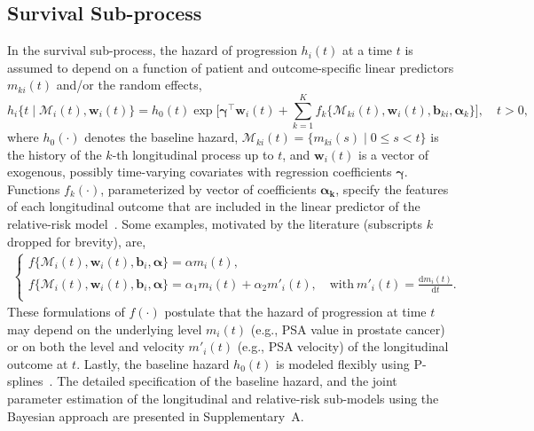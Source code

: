 \subsection{Survival Sub-process}
\label{subsec:surival_sub_model}
In the survival sub-process, the hazard of progression $h_i(t)$ at a time $t$ is assumed to depend on a function of patient and outcome-specific linear predictors $m_{ki}(t)$ and/or the random effects,
\begin{equation*}
\label{eq:rel_risk_model}
h_i\big\{t \mid \mathcal{M}_i(t), \boldsymbol{w}_i(t)\big\} = h_0(t) \exp\Big[\boldsymbol{\gamma}^{\top}\boldsymbol{w}_i(t) + \sum_{k=1}^{K} f_{k} \big\{ \mathcal{M}_{ki}(t), \boldsymbol{w}_i(t), \boldsymbol{b}_{ki}, \boldsymbol{\alpha}_{k} \big\}\Big], \quad t>0,
\end{equation*}
where $h_0(\cdot)$ denotes the baseline hazard, $\mathcal{M}_{ki}(t)=\{m_{ki}(s) \mid 0 \leq s < t \}$ is the history of the ${k\mbox{-th}}$ longitudinal process up to $t$, and $\boldsymbol{w}_i(t)$ is a vector of exogenous, possibly time-varying covariates with regression coefficients $\boldsymbol{\gamma}$. Functions $f_{k}(\cdot)$, parameterized by vector of coefficients $\boldsymbol{\alpha_{k}}$, specify the features of each longitudinal outcome that are included in the linear predictor of the relative-risk model~\citep{brown2009assessing,rizopoulos2012joint,taylor2013real}. Some examples, motivated by the literature (subscripts $k$ dropped for brevity), are,
\begin{eqnarray*}
\left \{
\begin{array}{l}
f\big\{\mathcal{M}_{i}(t), \boldsymbol{w}_i(t), \boldsymbol{b}_{i}, \boldsymbol{\alpha} \big\} = \alpha m_{i}(t),\\
f\big\{ \mathcal{M}_{i}(t), \boldsymbol{w}_i(t), \boldsymbol{b}_{i}, \boldsymbol{\alpha}\big\} = \alpha_1 m_{i}(t) + \alpha_2 m'_{i}(t),\quad \text{with}\  m'_{i}(t) = \frac{\mathrm{d}{m_{i}(t)}}{\mathrm{d}{t}}.\\
\end{array}
\right.
\end{eqnarray*}
These formulations of $f(\cdot)$ postulate that the hazard of progression at time $t$ may depend on the underlying level $m_i(t)$ (e.g., PSA value in prostate cancer) or on both the level and velocity $m'_i(t)$ (e.g., PSA velocity) of the longitudinal outcome at $t$. Lastly, the baseline hazard $h_0(t)$ is modeled flexibly using P-splines~\citep{eilers1996flexible}. The detailed specification of the baseline hazard, and the joint parameter estimation of the longitudinal and relative-risk sub-models using the Bayesian approach are presented in Supplementary~A.